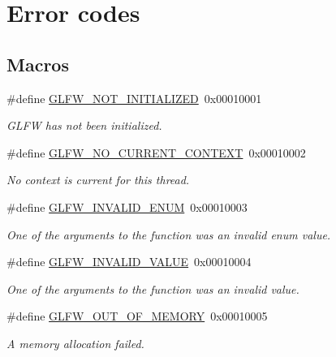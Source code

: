 \hypertarget{group__errors}{}\section{Error codes}
\label{group__errors}
\subsection*{Macros}
\begin{DoxyCompactItemize}
\item 
\#define \hyperlink{group__errors_ga2374ee02c177f12e1fa76ff3ed15e14a}{G\+L\+F\+W\+\_\+\+N\+O\+T\+\_\+\+I\+N\+I\+T\+I\+A\+L\+I\+Z\+E\+D}~0x00010001
\begin{DoxyCompactList}\small\item\em G\+L\+F\+W has not been initialized. \end{DoxyCompactList}\item 
\#define \hyperlink{group__errors_gaa8290386e9528ccb9e42a3a4e16fc0d0}{G\+L\+F\+W\+\_\+\+N\+O\+\_\+\+C\+U\+R\+R\+E\+N\+T\+\_\+\+C\+O\+N\+T\+E\+X\+T}~0x00010002
\begin{DoxyCompactList}\small\item\em No context is current for this thread. \end{DoxyCompactList}\item 
\#define \hyperlink{group__errors_ga76f6bb9c4eea73db675f096b404593ce}{G\+L\+F\+W\+\_\+\+I\+N\+V\+A\+L\+I\+D\+\_\+\+E\+N\+U\+M}~0x00010003
\begin{DoxyCompactList}\small\item\em One of the arguments to the function was an invalid enum value. \end{DoxyCompactList}\item 
\#define \hyperlink{group__errors_gaaf2ef9aa8202c2b82ac2d921e554c687}{G\+L\+F\+W\+\_\+\+I\+N\+V\+A\+L\+I\+D\+\_\+\+V\+A\+L\+U\+E}~0x00010004
\begin{DoxyCompactList}\small\item\em One of the arguments to the function was an invalid value. \end{DoxyCompactList}\item 
\#define \hyperlink{group__errors_ga9023953a2bcb98c2906afd071d21ee7f}{G\+L\+F\+W\+\_\+\+O\+U\+T\+\_\+\+O\+F\+\_\+\+M\+E\+M\+O\+R\+Y}~0x00010005
\begin{DoxyCompactList}\small\item\em A memory allocation failed. \end{DoxyCompactList}\item 

\end{DoxyCompactItemize}
